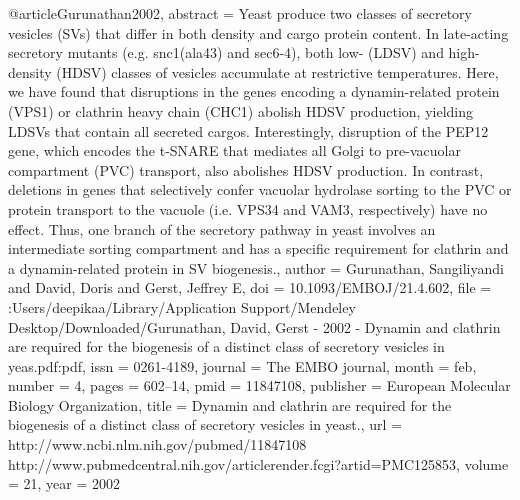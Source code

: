 @article{Gurunathan2002,
abstract = {Yeast produce two classes of secretory vesicles (SVs) that differ in both density and cargo protein content. In late-acting secretory mutants (e.g. snc1(ala43) and sec6-4), both low- (LDSV) and high-density (HDSV) classes of vesicles accumulate at restrictive temperatures. Here, we have found that disruptions in the genes encoding a dynamin-related protein (VPS1) or clathrin heavy chain (CHC1) abolish HDSV production, yielding LDSVs that contain all secreted cargos. Interestingly, disruption of the PEP12 gene, which encodes the t-SNARE that mediates all Golgi to pre-vacuolar compartment (PVC) transport, also abolishes HDSV production. In contrast, deletions in genes that selectively confer vacuolar hydrolase sorting to the PVC or protein transport to the vacuole (i.e. VPS34 and VAM3, respectively) have no effect. Thus, one branch of the secretory pathway in yeast involves an intermediate sorting compartment and has a specific requirement for clathrin and a dynamin-related protein in SV biogenesis.},
author = {Gurunathan, Sangiliyandi and David, Doris and Gerst, Jeffrey E},
doi = {10.1093/EMBOJ/21.4.602},
file = {:Users/deepikaa/Library/Application Support/Mendeley Desktop/Downloaded/Gurunathan, David, Gerst - 2002 - Dynamin and clathrin are required for the biogenesis of a distinct class of secretory vesicles in yeas.pdf:pdf},
issn = {0261-4189},
journal = {The EMBO journal},
month = {feb},
number = {4},
pages = {602--14},
pmid = {11847108},
publisher = {European Molecular Biology Organization},
title = {{Dynamin and clathrin are required for the biogenesis of a distinct class of secretory vesicles in yeast.}},
url = {http://www.ncbi.nlm.nih.gov/pubmed/11847108 http://www.pubmedcentral.nih.gov/articlerender.fcgi?artid=PMC125853},
volume = {21},
year = {2002}
}
